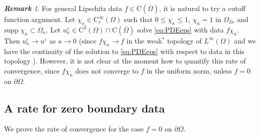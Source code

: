 \documentclass[12pt,reqno]{amsart}
\numberwithin{figure}{section}
\theoremstyle{plain}
\theoremstyle{remark}
\newtheorem{rem}{\bf{Remark}}
\numberwithin{equation}{section}
\newcommand{\rmC}{\mathrm{C}}
\begin{document}
\begin{rem} For general Lipschitz data $f\in \mathrm{C}(\overline{\Omega})$, it is natural to try a cutoff function argument. Let $\chi_{{\kappa}}\in \mathrm{C}_c^\infty(\Omega)$ such that $0\leq \chi_{\kappa}\leq 1$, $\chi_\kappa = 1$ in $\Omega_{2\kappa}$ and $\mathrm{supp}\;\chi_\kappa\subset\Omega_\kappa$. Let $u^\varepsilon_\kappa\in \rmC^2(\Omega)\cap\rmC(\overline{\Omega})$ solve \eqref{eq:PDEeps} with data $f\chi_{\kappa}$. Then $u^\varepsilon_\kappa\to u^\varepsilon$ as $\kappa\to 0$ (since $f\chi_\kappa\to f$ in the weak$^*$ topology of $L^\infty(\Omega)$ and we have the continuity of the solution to \eqref{eq:PDEeps} with respect to data in this topology \cite[Remark II.1]{Lasry1989}). However, it is not clear at the moment how to quantify this rate of convergence, since $f\chi_\kappa$ does not converge to $f$ in the uniform norm, unless $f = 0$ on $\partial\Omega$. 
\end{rem}
 


\subsection{A rate for zero boundary data}


We prove the rate of convergence for the case $f=0$ on $\partial \Omega$.
\end{document}
